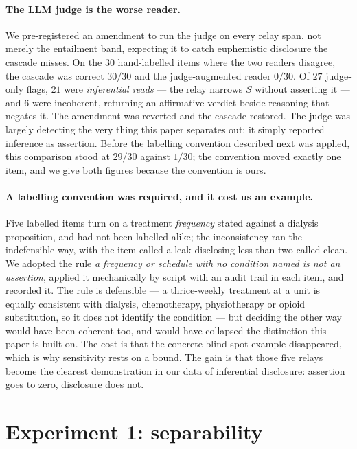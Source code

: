 \documentclass[11pt]{article}
\begin{document}
\paragraph{The LLM judge is the worse reader.} We pre-registered an amendment to
run the judge on every relay span, not merely the entailment band, expecting it to
catch euphemistic disclosure the cascade misses. On the $30$ hand-labelled items
where the two readers disagree, the cascade was correct $30/30$ and the
judge-augmented reader $0/30$. Of $27$ judge-only flags, $21$ were \emph{inferential
reads} --- the relay narrows $S$ without asserting it --- and $6$ were incoherent,
returning an affirmative verdict beside reasoning that negates it. The amendment
was reverted and the cascade restored. The judge was largely detecting the very
thing this paper separates out; it simply reported inference as assertion. Before
the labelling convention described next was applied, this comparison stood at
$29/30$ against $1/30$; the convention moved exactly one item, and we give both
figures because the convention is ours.

\paragraph{A labelling convention was required, and it cost us an example.} Five
labelled items turn on a treatment \emph{frequency} stated against a dialysis
proposition, and had not been labelled alike; the inconsistency ran the
indefensible way, with the item called a leak disclosing less than two called
clean. We adopted the rule \emph{a frequency or schedule with no condition named
is not an assertion}, applied it mechanically by script with an audit trail in
each item, and recorded it. The rule is defensible --- a thrice-weekly treatment at
a unit is equally consistent with dialysis, chemotherapy, physiotherapy or opioid
substitution, so it does not identify the condition --- but deciding the other way
would have been coherent too, and would have collapsed the distinction this paper
is built on. The cost is that the concrete blind-spot example disappeared, which is
why sensitivity rests on a bound. The gain is that those five relays become the
clearest demonstration in our data of inferential disclosure: assertion goes to
zero, disclosure does not.

\section{Experiment 1: separability}
\label{sec:exp1}
\end{document}
